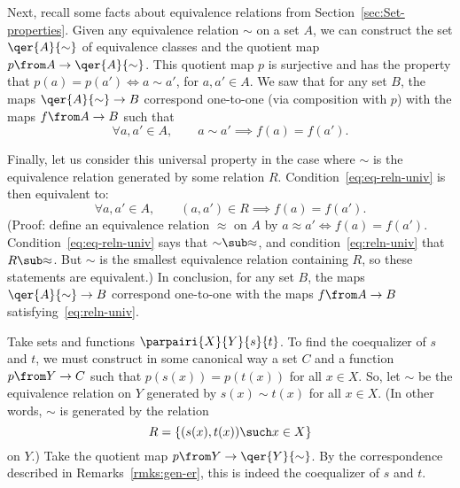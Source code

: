 \begin{remarks}
Next, recall some facts about equivalence relations from
Section~\ref{sec:Set-properties}.  Given any equivalence relation $\sim$ on
a set $A$, we can construct the set $\qer{A}{\sim}$%
%
%
%
of equivalence classes and the quotient map $p\from A \to \qer{A}{\sim}$.
This quotient map $p$ is surjective and has the property that $p(a) = p(a')
\iff a \sim a'$, for $a, a' \in A$.  We saw that for any set $B$, the maps
$\qer{A}{\sim} \to B$ correspond one-to-one (via composition with $p$) with
the maps $f\from A \to B$ such that
% 
\begin{equation}        
\label{eq:eq-reln-univ}
\forall a, a' \in A,
\qquad
a \sim a'
\implies
f(a) = f(a').
\end{equation}

Finally, let us consider this universal property in the case where $\sim$
is the equivalence relation generated by some relation $R$.
Condition~\eqref{eq:eq-reln-univ} is then equivalent to:
% 
\begin{equation}        
\label{eq:reln-univ}
\forall a, a' \in A,
\qquad
(a, a') \in R
\implies
f(a) = f(a').
\end{equation}
% 
(Proof: define an equivalence relation $\approx$ on $A$ by $a \approx a'
\iff f(a) = f(a')$.  Condition~\eqref{eq:eq-reln-univ} says that
$\mathord{\sim} \sub \mathord{\approx}$, and condition~\eqref{eq:reln-univ}
that $R \sub \mathord{\approx}$.  But $\sim$ is the smallest equivalence
relation containing $R$, so these statements are equivalent.)  In
conclusion, for any set $B$, the maps $\qer{A}{\sim} \to B$ correspond
one-to-one with the maps $f\from A \to B$ satisfying~\eqref{eq:reln-univ}.
\end{remarks}

\begin{example}
Take sets and functions $\parpairi{X}{Y}{s}{t}$.  To find the
coequalizer%
%
%
of $s$ and $t$, we must construct in some canonical way a set $C$ and a
function $p\from Y \to C$ such that $p(s(x)) = p(t(x))$ for all $x \in X$.
So, let $\sim$ be the equivalence relation on $Y$ generated by $s(x) \sim
t(x)$ for all $x \in X$.  (In other words, $\sim$ is generated by the
relation
\[
R = \{(s(x), t(x)) \such x \in X\}
\]
on $Y$.)  Take the quotient map $p\from Y \to \qer{Y}{\sim}$.  By the
correspondence described in Remarks~\ref{rmks:gen-er}, this is indeed the
coequalizer of $s$ and $t$.
\end{example}


